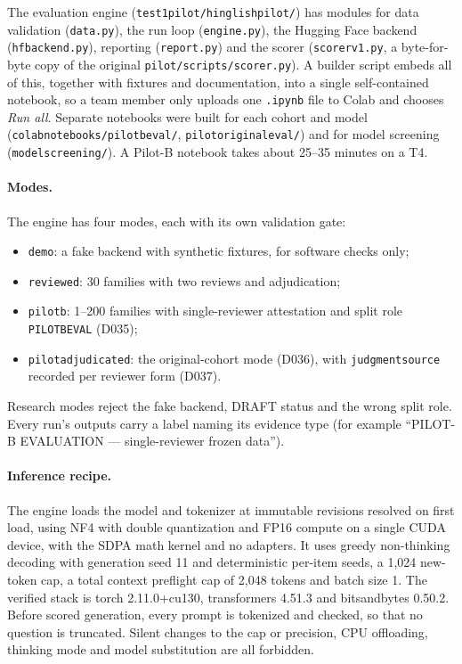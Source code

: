 \documentclass[12pt,a4paper,oneside]{report}
\renewcommand{\_}{\oldunderscore\allowbreak}
\begin{document}
The evaluation engine (\texttt{test1\_pilot/hinglish\_pilot/}) has modules for data validation (\texttt{data.py}), the run loop (\texttt{engine.py}), the Hugging Face backend (\texttt{hf\_backend.py}), reporting (\texttt{report.py}) and the scorer (\texttt{scorer\_v1.py}, a byte-for-byte copy of the original \texttt{pilot/scripts/scorer.py}). A builder script embeds all of this, together with fixtures and documentation, into a single self-contained notebook, so a team member only uploads one \texttt{.ipynb} file to Colab and chooses \emph{Run all}. Separate notebooks were built for each cohort and model (\texttt{colab\_notebooks/pilot\_b\_eval/}, \texttt{pilot\_original\_eval/}) and for model screening (\texttt{model\_screening/}). A Pilot-B notebook takes about 25--35 minutes on a T4.

\paragraph{Modes.} The engine has four modes, each with its own validation gate:
\begin{itemize}[nosep]
\item \texttt{demo}: a fake backend with synthetic fixtures, for software checks only;
\item \texttt{reviewed}: 30 families with two reviews and adjudication;
\item \texttt{pilot\_b}: 1--200 families with single-reviewer attestation and split role \texttt{PILOT\_B\_EVAL} (D035);
\item \texttt{pilot\_adjudicated}: the original-cohort mode (D036), with \texttt{judgment\_source} recorded per reviewer form (D037).
\end{itemize}
Research modes reject the fake backend, DRAFT status and the wrong split role. Every run's outputs carry a label naming its evidence type (for example ``PILOT-B EVALUATION --- single-reviewer frozen data'').

\paragraph{Inference recipe.} The engine loads the model and tokenizer at immutable revisions resolved on first load, using NF4 with double quantization and FP16 compute on a single CUDA device, with the SDPA math kernel and no adapters. It uses greedy non-thinking decoding with generation seed 11 and deterministic per-item seeds, a 1,024 new-token cap, a total context preflight cap of 2,048 tokens and batch size 1. The verified stack is torch 2.11.0+cu130, transformers 4.51.3 and bitsandbytes 0.50.2. Before scored generation, every prompt is tokenized and checked, so that no question is truncated. Silent changes to the cap or precision, CPU offloading, thinking mode and model substitution are all forbidden.
\end{document}
